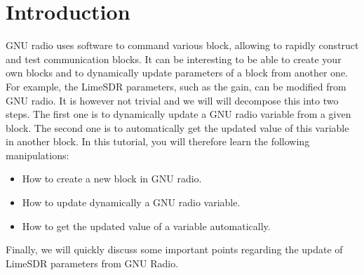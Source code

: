 \section*{Introduction}

GNU radio uses software to command various block, allowing to rapidly construct and test communication blocks. It can be interesting to be able to create your own blocks and to dynamically update parameters of a block from another one. For example, the LimeSDR parameters, such as the gain, can be modified from GNU radio. It is however not trivial and we will will decompose this into two steps. The first one is to dynamically update a GNU radio variable from a given block. The second one is to automatically get the updated value of this variable in another block. In this tutorial, you will therefore learn the following manipulations:

\begin{itemize}
    \item How to create a new block in GNU radio.
    \item How to update dynamically a GNU radio variable.
    \item How to get the updated value of a variable automatically.
\end{itemize}

Finally, we will quickly discuss some important points regarding the update of LimeSDR parameters from GNU Radio.
